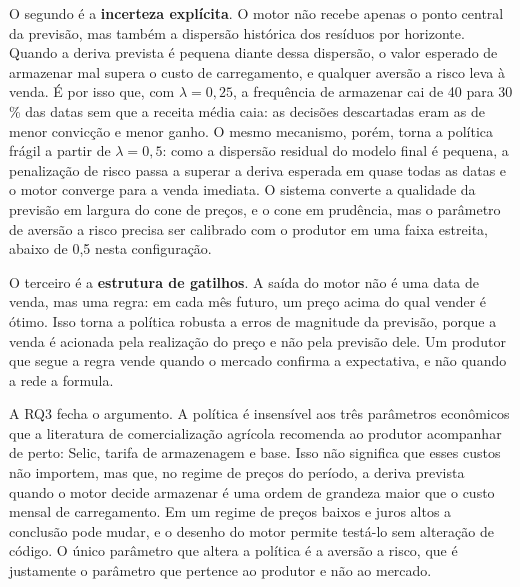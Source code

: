 O segundo é a \textbf{incerteza explícita}. O motor não recebe apenas o ponto central da previsão, mas também a dispersão histórica dos resíduos por horizonte. Quando a deriva prevista é pequena diante dessa dispersão, o valor esperado de armazenar mal supera o custo de carregamento, e qualquer aversão a risco leva à venda. É por isso que, com $\lambda = 0{,}25$, a frequência de armazenar cai de 40 para 30 \% das datas sem que a receita média caia: as decisões descartadas eram as de menor convicção e menor ganho. O mesmo mecanismo, porém, torna a política frágil a partir de $\lambda = 0{,}5$: como a dispersão residual do modelo final é pequena, a penalização de risco passa a superar a deriva esperada em quase todas as datas e o motor converge para a venda imediata. O sistema converte a qualidade da previsão em largura do cone de preços, e o cone em prudência, mas o parâmetro de aversão a risco precisa ser calibrado com o produtor em uma faixa estreita, abaixo de 0,5 nesta configuração.

O terceiro é a \textbf{estrutura de gatilhos}. A saída do motor não é uma data de venda, mas uma regra: em cada mês futuro, um preço acima do qual vender é ótimo. Isso torna a política robusta a erros de magnitude da previsão, porque a venda é acionada pela realização do preço e não pela previsão dele. Um produtor que segue a regra vende quando o mercado confirma a expectativa, e não quando a rede a formula.

A RQ3 fecha o argumento. A política é insensível aos três parâmetros econômicos que a literatura de comercialização agrícola recomenda ao produtor acompanhar de perto: Selic, tarifa de armazenagem e base. Isso não significa que esses custos não importem, mas que, no regime de preços do período, a deriva prevista quando o motor decide armazenar é uma ordem de grandeza maior que o custo mensal de carregamento. Em um regime de preços baixos e juros altos a conclusão pode mudar, e o desenho do motor permite testá-lo sem alteração de código. O único parâmetro que altera a política é a aversão a risco, que é justamente o parâmetro que pertence ao produtor e não ao mercado.


